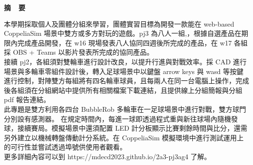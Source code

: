 \renewcommand{\baselinestretch}{1.5} %
\clearpage  %
\sectionef
{} %
\begin{center}
\LARGE\textbf{摘~~要}\\
\end{center}
\begin{flushleft}
\fontsize{14pt}{20pt}\sectionef\hspace{12pt}\quad 本學期採取個人及團體分組來學習，團體實習目標為開發一款能在 web-based CoppeliaSim 場景中雙方或多方對玩的遊戲。pj3 為八人一組,，根據自選產品在期限內完成產品開發，在 w16 現場發表八人協同四週後所完成的產品，在 w17 各組採 OBS + Teams 以影片發表所完成的協同產品。\\[12pt]
\fontsize{14pt}{20pt}\sectionef\hspace{12pt}\quad  接續 pj2，各組須對雙輪車進行設計改良，以提升行進與對戰效率。採 CAD 進行場景與多輪車零組件設計後，轉入足球場景中以鍵盤 arrow keys 與 wasd 等按鍵進行控制，對陣雙方每組將有四名輪車球員，且每兩人在同一台電腦上操作，完成後各組須在分組網站中提供所有相關檔案下載連結，且提供線上分組簡報與分組 pdf 報告連結。\\[12pt]	
\fontsize{14pt}{20pt}\sectionef\hspace{12pt}\quad 此專題是雙方利用各四台 BubbleRob 多輪車在一足球場景中進行對戰，雙方球門分別設有感測器。 在規定時間內，每進一球即透過程式重與新往球場內隨機發球，接續賽局。模擬場景中還須配置 LED 計分板顯示比賽剩餘時間與比分，還需另外建立以機械轉盤傳動計分系統。在 CoppeliaSim 模擬環境中進行測試運用上的可行性並嘗試透過埠號供使用者觀看。\\
  更多詳細內容可以到 https://mdecd2023.github.io/2a3-pj3ag4 了解。\\[10pt]

\end{flushleft}
\newpage
\renewcommand{\baselinestretch}{1.5} %
